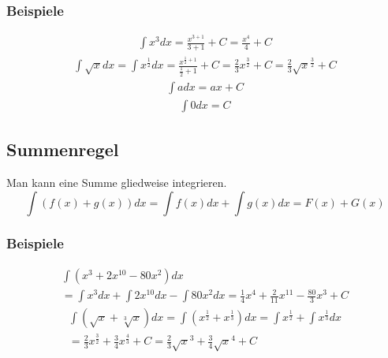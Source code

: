 \documentclass[12pt, a4paper]{report}
\begin{document}
\subsubsection{Beispiele}

\begin{fleqn}[\parindent]
\begin{equation}
\begin{split}
\int x^3 dx = \frac{x^{3+1}}{3+1}+C = \frac{x^{4}}{4}+C
\end{split}
\end{equation}
\begin{equation}
\begin{split}
\int \sqrt{x} dx = \int x^{\frac{1}{2}} dx = \frac{x^{\frac{1}{2}+1}}{\frac{1}{2}+1}+C=\frac{2}{3}x^{\frac{3}{2}}+C=\frac{2}{3}\sqrt{x}^{\frac{3}{2}}+C
\end{split}
\end{equation}
\begin{equation}
\begin{split}
\int adx = ax+C
\end{split}
\end{equation}
\begin{equation}
\begin{split}
\int 0dx = C
\end{split}
\end{equation}
\end{fleqn}

\subsection{Summenregel}

Man kann eine Summe gliedweise integrieren.
\begin{equation}
\int (f(x)+g(x)) dx = \int f(x)dx+\int g(x)dx=F(x)+G(x)
\end{equation}

\subsubsection{Beispiele}

\begin{fleqn}[\parindent]
\begin{multline}
\int (x^3 + 2x^{10}-80x^2)dx\\=
\int x^3dx + \int 2x^{10}dx - \int 80x^2dx = \frac{1}{4}x^4 + \frac{2}{11}x^{11} - \frac{80}{3}x^3 + C
\end{multline}
\begin{multline}
\int (\sqrt{x} + \sqrt[3]{x}) dx = \int (x^{\frac{1}{2}}+x^{\frac{1}{3}}) dx =\int x^{\frac{1}{2}}+\int x^{\frac{1}{3}} dx\\ =
\frac{2}{3}x^{\frac{3}{2}} + \frac{3}{4}x^{\frac{4}{3}} + C = \frac{2}{3}\sqrt{x}^3 + \frac{3}{4}\sqrt{x}^4 +C
\end{multline}
\end{fleqn}
\end{document}

